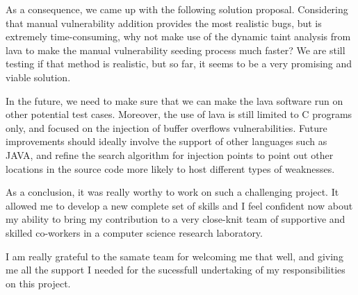 As a consequence, we came up with the following solution proposal. Considering that manual vulnerability addition provides the most realistic bugs, but is extremely time-consuming, why not make use of the dynamic taint analysis from \gls{lava} to make the manual vulnerability seeding process much faster? We are still testing if that method is realistic, but so far, it seems to be a very promising and viable solution.

In the future, we need to make sure that we can make the \gls{lava} software run on other potential test cases. Moreover, the use of \gls{lava} is still limited to C programs only, and focused on the injection of buffer overflows vulnerabilities. Future improvements should ideally involve the support of other languages such as JAVA, and refine the search algorithm for injection points to point out other locations in the source code more likely to host different types of weaknesses.

As a conclusion, it was really worthy to work on such a challenging project. It allowed me to develop a new complete set of skills and I feel confident now about my ability to bring my contribution to a very close-knit team of supportive and skilled co-workers in a computer science research laboratory.

I am really grateful to the \gls{samate} team for welcoming me that well, and giving me all the support I needed for the sucessfull undertaking of my responsibilities on this project.
